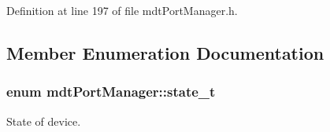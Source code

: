 Definition at line 197 of file mdt\-Port\-Manager.\-h.



\subsection{Member Enumeration Documentation}
\hypertarget{classmdt_port_manager_a9448339d7f08ca5e18b904df25b382da}{
\subsubsection[{state\-\_\-t}]{\setlength{\rightskip}{0pt plus 5cm}enum {\bf mdt\-Port\-Manager\-::state\-\_\-t}}}\label{classmdt_port_manager_a9448339d7f08ca5e18b904df25b382da}


State of device. 

